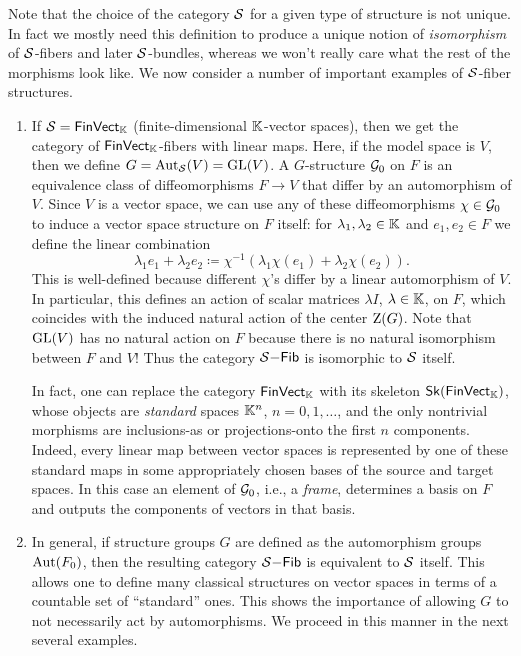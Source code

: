 Note that the choice of the category $\mathcal{S}$ for a given type of structure is not unique. In fact we mostly need this definition to produce a unique notion of \emph{isomorphism} of $\mathcal{S}$-fibers and later $\mathcal{S}$-bundles, whereas we won't really care what the rest of the morphisms look like. We now consider a number of important examples of $\mathcal{S}$-fiber structures.
\begin{example}\label{ex linear G-structures}
    \begin{enumerate}
        \item If $\mathcal{S}=\mathsf{FinVect}_{\mathbb{K}}$ (finite-dimensional $\mathbb{K}$-vector spaces), then we get the category of $\mathsf{FinVect}_{\mathbb{K}}$-fibers with linear maps. Here, if the model space is $V$, then we define $G=\operatorname{Aut}_{\mathcal{S}}(V)=\operatorname{GL}(V)$. A $G$-structure $\mathcal{G}_0$ on $F$ is an equivalence class of diffeomorphisms $F\to V$ that differ by an automorphism of $V$. Since $V$ is a vector space, we can use any of these diffeomorphisms $\chi\in\mathcal{G}_0$ to induce a vector space structure on $F$ itself: for $\lambda_1,\lambda_2\in\mathbb{K}$ and $e_1,e_2\in F$ we define the linear combination
        \[\lambda_1e_1+\lambda_2 e_2\coloneqq \chi^{-1}(\lambda_1\chi(e_1)+\lambda_2\chi(e_2)).\]
        This is well-defined because different $\chi$'s differ by a linear automorphism of $V$. In particular, this defines an action of scalar matrices $\lambda I$, $\lambda\in\mathbb{K}$, on $F$, which coincides with the induced natural action of the center $\mathrm{Z}(G)$. Note that $\operatorname{GL}(V)$ has no natural action on $F$ because there is no natural isomorphism between $F$ and $V$! Thus the category $\mathcal{S}\mathsf{-Fib}$ is isomorphic to $\mathcal{S}$ itself.

        In fact, one can replace the category $\mathsf{FinVect}_{\mathbb{K}}$ with its skeleton $\mathsf{Sk}(\mathsf{FinVect}_{\mathbb{K}})$, whose objects are \emph{standard} spaces $\mathbb{K}^n$, $n=0,1,\ldots$, and the only nontrivial morphisms are inclusions-as or projections-onto the first $n$ components. Indeed, every linear map between vector spaces is represented by one of these standard maps in some appropriately chosen bases of the source and target spaces. In this case an element of $\mathcal{G}_0$, i.e., a \emph{frame}, determines a basis on $F$ and outputs the components of vectors in that basis.
        
        \item In general, if structure groups $G$ are defined as the automorphism groups $\operatorname{Aut}(F_0)$, then the resulting category $\mathcal{S}\mathsf{-Fib}$ is equivalent to $\mathcal{S}$ itself. This allows one to define many classical structures on vector spaces in terms of a countable set of ``standard'' ones. This shows the importance of allowing $G$ to not necessarily act by automorphisms. We proceed in this manner in the next several examples.
        

\end{enumerate}
\end{example}
